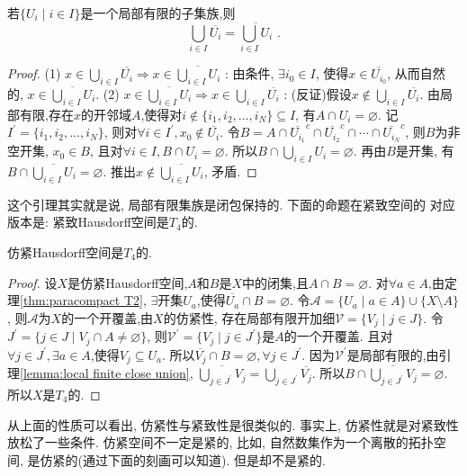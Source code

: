 \begin{lemma} \label{lemma:local finite close union}
  若$\{ U_i \mid i \in I\}$是一个局部有限的子集族,则
  \[
    \bigcup_{i \in I}\overline{U_i} = \overline{\bigcup_{i \in I}U_i} \,\,.
  \]
\end{lemma}
\begin{proof}
  (1) $x \in \bigcup_{i \in I}\overline{U_i} \Longrightarrow x \in \overline{\bigcup_{i \in I}U_i}\,\,$:
  由条件, $\exists i_0 \in I$, 使得$x \in \overline{U_{i_0}}$,
  从而自然的, $x \in \overline{\bigcup_{i \in I}U_i}$.\newline
  (2) $x \in \overline{\bigcup_{i \in I}U_i} \Longrightarrow x \in \bigcup_{i \in I}\overline{U_i}\,\,$:
  (反证)假设$x \notin \bigcup_{i \in I}\overline{U_i}$.
  由局部有限,存在$x$的开邻域$A$,使得对$i \notin \{i_1, i_2, ..., i_N \} \subseteq I$,
  有$A \cap U_i = \varnothing$. 记$I^{'} = \{i_1, i_2, ..., i_N \}$,
  则对$\forall i \in I^{'}, x_0 \notin \overline{U_i}$. 
  令$B = A \cap \overline{U_{i_1}}^c \cap \overline{U_{i_2}}^c \cap \cdots \cap \overline{U_{i_N}}^c$,
  则$B$为非空开集, $x_0 \in B$, 且对$\forall i \in I, B \cap U_i = \varnothing$.
  所以$B \cap \bigcup_{i \in I} U_i = \varnothing$.
  再由$B$是开集, 有$B \cap \overline{\bigcup_{i \in I} U_i} = \varnothing$.
  推出$x \notin \overline{\bigcup_{i \in I} U_i}$, 矛盾.
\end{proof}

这个引理其实就是说, 局部有限集族是闭包保持的. 下面的命题在紧致空间的
对应版本是: 紧致Hausdorff空间是$T_4$的.

\begin{thm}
  仿紧Hausdorff空间是$T_4$的.
\end{thm}
\begin{proof}
  设$X$是仿紧Hausdorff空间,$A$和$B$是$X$中的闭集,且$A \cap B = \varnothing$.
  对$\forall a \in A$,由定理\ref{thm:paracompact T2},
  $\exists$开集$U_a$,使得$\overline{U_a} \cap B = \varnothing$.
  令$\mathscr{A} = \{ U_a \mid a \in A \} \cup \{ X \setminus A \}$,
  则$\mathscr{A}$为$X$的一个开覆盖,由$X$的仿紧性,
  存在局部有限开加细$\mathscr{V} = \{ V_j \mid j \in J \}$.
  令$J^{'} = \{ j \in J \mid V_j \cap A \neq \varnothing \}$,
  则$\mathscr{V}^{'} = \{ V_j \mid j \in J^{'} \}$是$A$的一个开覆盖.
  且对$\forall j \in J^{'}, \exists a \in A$,使得$V_j \subseteq U_a$.
  所以$\overline{V_j} \cap B = \varnothing, \forall j \in J^{'}$.
  因为$\mathscr{V}^{'}$是局部有限的,由引理\ref{lemma:local finite close union},
  $\overline{\bigcup_{j \in J^{'}}V_j} = \bigcup_{j \in J^{'}} \overline{V_j}$.
  所以$B \cap \overline{\bigcup_{j \in J^{'}}V_j} = \varnothing$.
  所以$X$是$T_4$的.
\end{proof}

从上面的性质可以看出, 仿紧性与紧致性是很类似的.
事实上, 仿紧性就是对紧致性放松了一些条件. 仿紧空间不一定是紧的,
比如, 自然数集作为一个离散的拓扑空间, 是仿紧的(通过下面的刻画可以知道).
但是却不是紧的.
